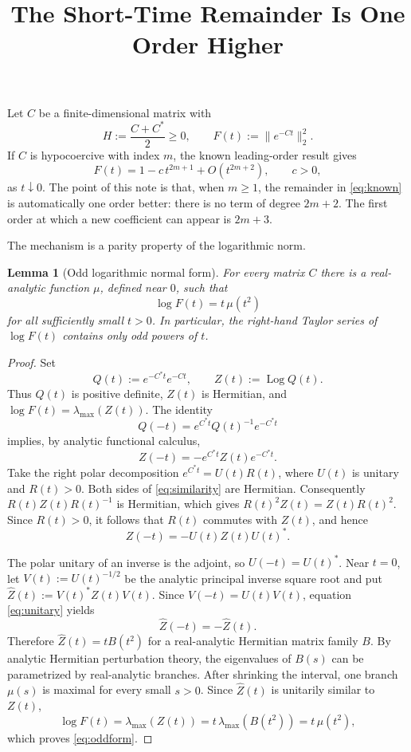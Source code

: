 \documentclass[11pt,a4paper]{article}
\title{\bfseries The Short-Time Remainder Is One Order Higher}
\author{}
\date{}
\newtheorem{lemma}{Lemma}
\DeclareMathOperator{\Log}{Log}
\begin{document}
\maketitle
\vspace{-2.2em}

Let $C$ be a finite-dimensional matrix with
\[
H:=\frac{C+C^*}{2}\geq 0,
\qquad
F(t):=\lVert e^{-Ct}\rVert_2^2.
\]
If $C$ is hypocoercive with index $m$, the known leading-order result gives
\begin{equation}\label{eq:known}
F(t)=1-c\,t^{2m+1}+O(t^{2m+2}),
\qquad c>0,
\end{equation}
as $t\downarrow0$.  The point of this note is that, when $m\geq1$, the
remainder in \eqref{eq:known} is automatically one order better: there is no
term of degree $2m+2$.  The first order at which a new coefficient can appear
is $2m+3$.

The mechanism is a parity property of the logarithmic norm.

\begin{lemma}[Odd logarithmic normal form]\label{lem:odd}
For every matrix $C$ there is a real-analytic function $\mu$, defined near
$0$, such that
\begin{equation}\label{eq:oddform}
\log F(t)=t\,\mu(t^2)
\end{equation}
for all sufficiently small $t>0$.  In particular, the right-hand Taylor
series of $\log F(t)$ contains only odd powers of $t$.
\end{lemma}

\begin{proof}
Set
\[
Q(t):=e^{-C^*t}e^{-Ct},
\qquad
Z(t):=\Log Q(t).
\]
Thus $Q(t)$ is positive definite, $Z(t)$ is Hermitian, and
$\log F(t)=\lambda_{\max}(Z(t))$.  The identity
\[
Q(-t)=e^{C^*t}Q(t)^{-1}e^{-C^*t}
\]
implies, by analytic functional calculus,
\begin{equation}\label{eq:similarity}
Z(-t)=-e^{C^*t}Z(t)e^{-C^*t}.
\end{equation}
Take the right polar decomposition $e^{C^*t}=U(t)R(t)$, where $U(t)$ is
unitary and $R(t)>0$.  Both sides of \eqref{eq:similarity} are Hermitian.
Consequently $R(t)Z(t)R(t)^{-1}$ is Hermitian, which gives
$R(t)^2Z(t)=Z(t)R(t)^2$.  Since $R(t)>0$, it follows that $R(t)$ commutes with
$Z(t)$, and hence
\begin{equation}\label{eq:unitary}
Z(-t)=-U(t)Z(t)U(t)^*.
\end{equation}

The polar unitary of an inverse is the adjoint, so $U(-t)=U(t)^*$.  Near
$t=0$, let $V(t):=U(t)^{-1/2}$ be the analytic principal inverse square root and put
$\widehat Z(t):=V(t)^*Z(t)V(t)$.  Since $V(-t)=U(t)V(t)$, equation
\eqref{eq:unitary} yields
\[
\widehat Z(-t)=-\widehat Z(t).
\]
Therefore $\widehat Z(t)=tB(t^2)$ for a real-analytic Hermitian matrix family
$B$.  By analytic Hermitian perturbation theory, the eigenvalues of $B(s)$
can be parametrized by real-analytic branches.  After shrinking the interval,
one branch $\mu(s)$ is maximal for every small $s>0$.  Since $\widehat Z(t)$
is unitarily similar to $Z(t)$,
\[
\log F(t)=\lambda_{\max}(Z(t))
=t\,\lambda_{\max}(B(t^2))=t\,\mu(t^2),
\]
which proves \eqref{eq:oddform}.
\end{proof}
\end{document}
